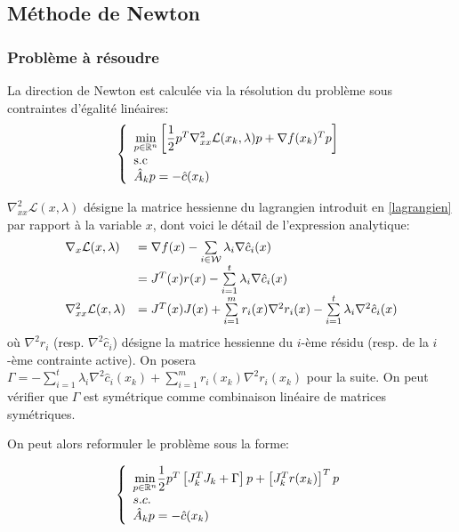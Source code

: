 \documentclass[a4paper,11pt]{article}
\newcommand{\real}{\mathbb{R}}
\newcommand{\ha}{\hat{A}}
\newcommand{\hc}{\hat{c}}
\numberwithin{equation}{section}
\begin{document}
\subsection{Méthode de Newton} \label{newtonmethod}

\subsubsection{Problème à résoudre}

La direction de Newton est calculée via la résolution du problème sous contraintes d'égalité linéaires:
$$
\left\{ \begin{array}{l l l}
\underset{p \in \real^{n}}{\min}\left[ \dfrac{1}{2}p^{T}\nabla_{xx}^{2}\mathcal{L}(x_{k},\lambda)p + \nabla f(x_{k})^{T}p\right]\\
\text{s.c}\\
\ha_{k} p = -\hat{c}(x_{k})
\end{array} \right.
$$

$\nabla^{2}_{xx}\mathcal{L}(x,\lambda)$ désigne la matrice hessienne du lagrangien introduit en \ref{lagrangien} par rapport à la variable $x$, dont voici le détail de l'expression analytique:
\[
\begin{array}{l l l}\nabla_{x}\mathcal{L}(x,\lambda)&=\nabla f(x) - \sum\limits_{i \in \mathcal{W}} \lambda_{i}\nabla \hc_{i}(x)\\
&= J^{T}(x)r(x) - \sum\limits_{i=1}^{t} \lambda_{i}\nabla \hc_{i}(x)\\
\nabla^{2}_{xx}\mathcal{L}(x,\lambda) &= J^{T}(x)J(x)+ \sum\limits_{i=1}^{m}r_i(x)\nabla^2r_i(x) - \sum\limits_{i=1}^{t}\lambda_i\nabla^2\hc_{i}(x)
\end{array}
\]
où $\nabla^2 r_i$ (resp. $\nabla^2 \hc_i$) désigne la matrice hessienne du $i$-ème résidu (resp. de la $i$-ème contrainte active).
On posera $\Gamma = - \sum\limits_{i=1}^{t}\lambda_i\nabla^2\hc_i(x_{k}) + \sum\limits_{i=1}^{m}r_i(x_{k})\nabla^2r_i(x_{k})$ pour la suite. On peut vérifier que $\Gamma$ est symétrique comme combinaison linéaire de matrices symétriques. 

On peut alors reformuler le problème sous la forme:


\begin{equation} \label{newtonpb}
 \left\{ \begin{array}{l l l} \underset{p \in \mathbb{R}^n}{\min} \dfrac{1}{2} p^T\left[J_{k}^TJ_{k} + \Gamma \right]p + \left[J_{k}^Tr(x_{k})\right]^Tp \\ 
s.c.\\
\ha_{k}p = -\hc(x_{k})
\end{array} \right.
\end{equation}
\end{document}
